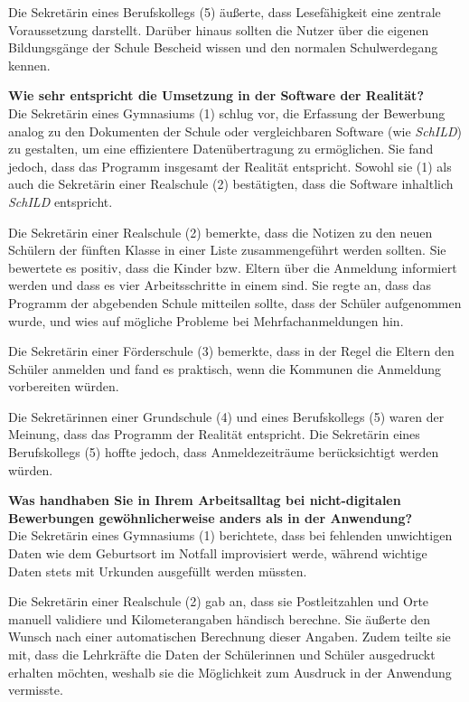 Die Sekretärin eines Berufskollegs (5) äußerte, dass Lesefähigkeit eine zentrale Voraussetzung darstellt. Darüber hinaus sollten die Nutzer über die eigenen Bildungsgänge der Schule Bescheid wissen und den normalen Schulwerdegang kennen.

\textbf{Wie sehr entspricht die Umsetzung in der Software der Realität?}\\
Die Sekretärin eines Gymnasiums (1) schlug vor, die Erfassung der Bewerbung analog zu den Dokumenten der Schule oder vergleichbaren Software (wie \textit{SchILD}) zu gestalten, um eine effizientere Datenübertragung zu ermöglichen. Sie fand jedoch, dass das Programm insgesamt der Realität entspricht. Sowohl sie (1) als auch die Sekretärin einer Realschule (2) bestätigten, dass die Software inhaltlich \textit{SchILD}  entspricht.

Die Sekretärin einer Realschule (2) bemerkte, dass die Notizen zu den neuen Schülern der fünften Klasse in einer Liste zusammengeführt werden sollten. Sie bewertete es positiv, dass die Kinder bzw. Eltern über die Anmeldung informiert werden und dass es vier Arbeitsschritte in einem sind. Sie regte an, dass das Programm der abgebenden Schule mitteilen sollte, dass der Schüler aufgenommen wurde, und wies auf mögliche Probleme bei Mehrfachanmeldungen hin.

Die Sekretärin einer Förderschule (3) bemerkte, dass in der Regel die Eltern den Schüler anmelden und fand es praktisch, wenn die Kommunen die Anmeldung vorbereiten würden.

Die Sekretärinnen einer Grundschule (4) und eines Berufskollegs (5) waren der Meinung, dass das Programm der Realität entspricht. Die Sekretärin eines Berufskollegs (5) hoffte jedoch, dass Anmeldezeiträume berücksichtigt werden würden.

\textbf{Was handhaben Sie in Ihrem Arbeitsalltag bei nicht-digitalen Bewerbungen gewöhnlicherweise anders als in der Anwendung?}\\
Die Sekretärin eines Gymnasiums (1) berichtete, dass bei fehlenden unwichtigen Daten wie dem Geburtsort im Notfall improvisiert werde, während wichtige Daten stets mit Urkunden ausgefüllt werden müssten.

Die Sekretärin einer Realschule (2) gab an, dass sie Postleitzahlen und Orte manuell validiere und Kilometerangaben händisch berechne. Sie äußerte den Wunsch nach einer automatischen Berechnung dieser Angaben. Zudem teilte sie mit, dass die Lehrkräfte die Daten der Schülerinnen und Schüler ausgedruckt erhalten möchten, weshalb sie die Möglichkeit zum Ausdruck in der Anwendung vermisste.

